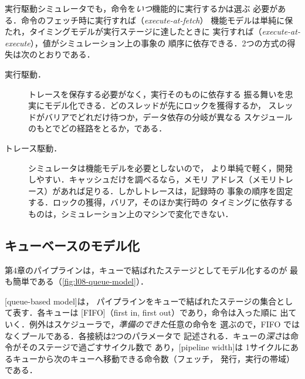 \documentclass[../main.tex]{subfiles}
\begin{document}
実行駆動シミュレータでも，命令を\emph{いつ}機能的に実行するかは選ぶ
必要がある．命令のフェッチ時に実行すれば（\emph{execute-at-fetch}）
機能モデルは単純に保たれ，タイミングモデルが実行ステージに達したときに
実行すれば（\emph{execute-at-execute}），値がシミュレーション上の事象の
順序に依存できる．2つの方式の得失は次のとおりである．
\begin{description}
  \item[実行駆動．]  トレースを保存する必要がなく，実行そのものに依存する
    振る舞いを忠実にモデル化できる．どのスレッドが先にロックを獲得するか，
    スレッドがバリアでどれだけ待つか，データ依存の分岐が異なる
    スケジュールのもとでどの経路をとるか，である．
  \item[トレース駆動．]  シミュレータは機能モデルを必要としないので，
    より単純で軽く，開発しやすい．キャッシュだけを調べるなら，メモリ
    アドレス（メモリトレース）があれば足りる．しかしトレースは，記録時の
    事象の順序を固定する．ロックの獲得，バリア，そのほか実行時の
    タイミングに依存するものは，シミュレーション上のマシンで変化できない．
\end{description}

\subsection{キューベースのモデル化}

第4章のパイプラインは，キューで結ばれたステージとしてモデル化するのが
最も簡単である（\cref{fig:l08-queue-model}）．

\begin{definition}[キューベースモデル]
  \label{def:l08-queue-model}
  [queue-based model]は，
  パイプラインをキューで結ばれたステージの集合として表す．各キューは
  [FIFO]（first in, first out）であり，命令は入った順に
  出ていく．例外はスケジューラで，\emph{準備のできた}任意の命令を
  選ぶので，FIFO ではなくプールである．各接続は2つのパラメータで
  記述される．キューの\emph{深さ}は命令がそのステージで過ごすサイクル数で
  あり，[pipeline width]は
  1サイクルにあるキューから次のキューへ移動できる命令数（フェッチ，
  発行，実行の帯域）である．
\end{definition}
\end{document}
